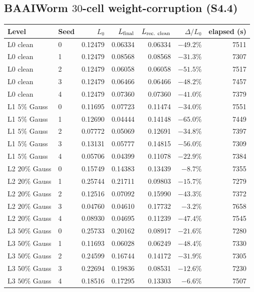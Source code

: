 \documentclass[11pt]{article}
\begin{document}
\subsection{BAAIWorm $30$-cell weight-corruption (S4.4)}
\begin{longtable}{l l r r r r r}\toprule
Level & Seed & $L_0$ & $L_{\rm final}$ & $L_{\rm rec.\ clean}$ & $\Delta/L_0$ & elapsed (s) \\\midrule\endhead
L0 clean & 0 & 0.12479 & 0.06334 & 0.06334 & $-49.2\%$ & 7511 \\
L0 clean & 1 & 0.12479 & 0.08568 & 0.08568 & $-31.3\%$ & 7307 \\
L0 clean & 2 & 0.12479 & 0.06058 & 0.06058 & $-51.5\%$ & 7517 \\
L0 clean & 3 & 0.12479 & 0.06466 & 0.06466 & $-48.2\%$ & 7457 \\
L0 clean & 4 & 0.12479 & 0.07360 & 0.07360 & $-41.0\%$ & 7379 \\
L1 $5\%$ Gauss & 0 & 0.11695 & 0.07723 & 0.11474 & $-34.0\%$ & 7551 \\
L1 $5\%$ Gauss & 1 & 0.12690 & 0.04444 & 0.14148 & $-65.0\%$ & 7449 \\
L1 $5\%$ Gauss & 2 & 0.07772 & 0.05069 & 0.12691 & $-34.8\%$ & 7397 \\
L1 $5\%$ Gauss & 3 & 0.13131 & 0.05777 & 0.14815 & $-56.0\%$ & 7309 \\
L1 $5\%$ Gauss & 4 & 0.05706 & 0.04399 & 0.11078 & $-22.9\%$ & 7384 \\
L2 $20\%$ Gauss & 0 & 0.15749 & 0.14383 & 0.13439 & $-8.7\%$ & 7355 \\
L2 $20\%$ Gauss & 1 & 0.25744 & 0.21711 & 0.09803 & $-15.7\%$ & 7279 \\
L2 $20\%$ Gauss & 2 & 0.12516 & 0.07092 & 0.15990 & $-43.3\%$ & 7372 \\
L2 $20\%$ Gauss & 3 & 0.04760 & 0.04610 & 0.17732 & $-3.2\%$ & 7658 \\
L2 $20\%$ Gauss & 4 & 0.08930 & 0.04695 & 0.11239 & $-47.4\%$ & 7545 \\
L3 $50\%$ Gauss & 0 & 0.25733 & 0.20162 & 0.08917 & $-21.6\%$ & 7280 \\
L3 $50\%$ Gauss & 1 & 0.11693 & 0.06028 & 0.06249 & $-48.4\%$ & 7330 \\
L3 $50\%$ Gauss & 2 & 0.24599 & 0.16744 & 0.14172 & $-31.9\%$ & 7305 \\
L3 $50\%$ Gauss & 3 & 0.22694 & 0.19836 & 0.08531 & $-12.6\%$ & 7230 \\
L3 $50\%$ Gauss & 4 & 0.18516 & 0.17295 & 0.13303 & $-6.6\%$ & 7507 \\

\end{longtable}
\end{document}
